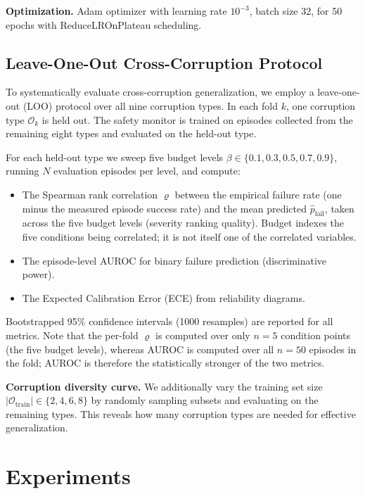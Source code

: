 \documentclass[letterpaper]{IEEEtran}
\renewcommand{\rho}{\varrho}
\begin{document}
\noindent\textbf{Optimization.}
Adam optimizer with learning rate $10^{-3}$, batch size 32, for 50 epochs with ReduceLROnPlateau scheduling.

\subsection{Leave-One-Out Cross-Corruption Protocol}
\label{sec:loo}

To systematically evaluate cross-corruption generalization, we employ a leave-one-out (LOO) protocol over all nine corruption types.
In each fold $k$, one corruption type $\mathcal{O}_k$ is held out.
The safety monitor is trained on episodes collected from the remaining eight types and evaluated on the held-out type.

For each held-out type we sweep five budget levels $\beta \in \{0.1, 0.3, 0.5, 0.7, 0.9\}$, running $N$ evaluation episodes per level, and compute:
\begin{itemize}
    \item The Spearman rank correlation $\rho$ between the empirical failure rate (one minus the measured episode success rate) and the mean predicted $\hat{p}_{\text{fail}}$, taken across the five budget levels (severity ranking quality). Budget indexes the five conditions being correlated; it is not itself one of the correlated variables.
    \item The episode-level AUROC for binary failure prediction (discriminative power).
    \item The Expected Calibration Error (ECE) from reliability diagrams.
\end{itemize}
Bootstrapped 95\% confidence intervals (1000 resamples) are reported for all metrics.
Note that the per-fold $\rho$ is computed over only $n=5$ condition points (the five budget levels), whereas AUROC is computed over all $n=50$ episodes in the fold; AUROC is therefore the statistically stronger of the two metrics.

\noindent\textbf{Corruption diversity curve.}
We additionally vary the training set size $|\mathcal{O}_{\text{train}}| \in \{2, 4, 6, 8\}$ by randomly sampling subsets and evaluating on the remaining types.
This reveals how many corruption types are needed for effective generalization.

\section{Experiments}
\label{sec:experiments}
\end{document}
